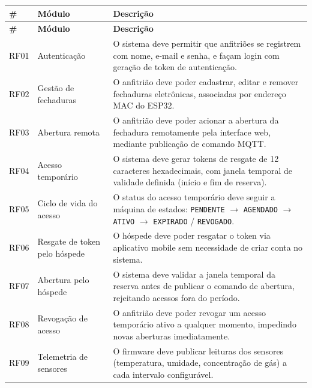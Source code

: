 \documentclass[12pt,a4paper]{article}
\begin{document}
\begin{longtable}{p{1.100cm} p{3.800cm} p{10.00cm}}
  \toprule
  \textbf{\#} & \textbf{Módulo} & \textbf{Descrição} \\
  \midrule
  \endfirsthead
  \toprule
  \textbf{\#} & \textbf{Módulo} & \textbf{Descrição} \\
  \midrule
  \endhead
  \bottomrule
  \endfoot

  RF01 & Autenticação & O sistema deve permitir que anfitriões se registrem com nome,
         e-mail e senha, e façam login com geração de token de autenticação. \\[3pt]

  RF02 & Gestão de fechaduras & O anfitrião deve poder cadastrar, editar e remover
         fechaduras eletrônicas, associadas por endereço MAC do ESP32. \\[3pt]

  RF03 & Abertura remota & O anfitrião deve poder acionar a abertura da fechadura
         remotamente pela interface web, mediante publicação de comando MQTT. \\[3pt]

  RF04 & Acesso temporário & O sistema deve gerar tokens de resgate de 12 caracteres
         hexadecimais, com janela temporal de validade definida (início e fim de reserva). \\[3pt]

  RF05 & Ciclo de vida do acesso & O status do acesso temporário deve seguir a máquina
         de estados: \texttt{PENDENTE} $\rightarrow$ \texttt{AGENDADO} $\rightarrow$
         \texttt{ATIVO} $\rightarrow$ \texttt{EXPIRADO} / \texttt{REVOGADO}. \\[3pt]

  RF06 & Resgate de token pelo hóspede & O hóspede deve poder resgatar o token via
         aplicativo mobile sem necessidade de criar conta no sistema. \\[3pt]

  RF07 & Abertura pelo hóspede & O sistema deve validar a janela temporal da reserva
         antes de publicar o comando de abertura, rejeitando acessos fora do período. \\[3pt]

  RF08 & Revogação de acesso & O anfitrião deve poder revogar um acesso temporário
         ativo a qualquer momento, impedindo novas aberturas imediatamente. \\[3pt]

  RF09 & Telemetria de sensores & O firmware deve publicar leituras dos sensores
         (temperatura, umidade, concentração de gás) a cada intervalo configurável. \\[3pt]


\end{longtable}
\end{document}
